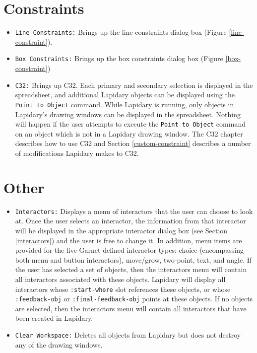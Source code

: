 \section{Constraints}
\begin{itemize}
\item {\tt Line Constraints:} Brings up the line constraints dialog box
(Figure \ref{line-constraint}).

\item {\tt Box Constraints:} Brings up the box constraints dialog box
(Figure \ref{box-constraint})

\item {}
{\tt C32:} Brings up C32. Each primary and secondary selection is displayed
in the spreadsheet, and additional Lapidary objects can be displayed using
the {\tt Point to Object} command. While Lapidary is running, only objects in
Lapidary's drawing windows can be displayed in the spreadsheet. Nothing will
happen if the user attempts to execute the {\tt Point to Object} command on
an object which is not in a Lapidary drawing window. The C32 chapter
describes how to use C32 and Section
\ref{custom-constraint} describes a number of modifications Lapidary makes
to C32.

\end{itemize}


\section{Other}
\begin{itemize}
\item {}
{\tt Interactors:} Displays a menu of interactors that the user
can choose to look at. Once the user selects an interactor, the information
from that interactor will be displayed in the appropriate interactor
dialog box (see Section \ref{interactors}) and the user is free to change it.
In addition, menu items are provided for the five Garnet-defined interactor
types: choice (encompassing both menu and button interactors), move/grow,
two-point, text, and angle.  If the user has selected a set of objects, then the interactors menu will
contain all interactors associated with these objects.
Lapidary will display all interactors whose {\tt :start-where} slot references
these objects, or whose {\tt :feedback-obj} or {\tt :final-feedback-obj} points
at these objects.  If no objects are selected, then the interactors menu will contain all interactors
that have been created in Lapidary.

\item {}
{\tt Clear Workspace:} Deletes all objects from Lapidary but does not destroy any
of the drawing windows.

\end{itemize}



